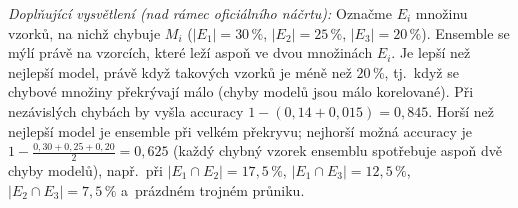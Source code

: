 \medskip
\noindent\textit{Doplňující vysvětlení (nad rámec oficiálního náčrtu):} Označme $E_i$ množinu vzorků, na nichž chybuje $M_i$ ($|E_1|=30\,\%$, $|E_2|=25\,\%$, $|E_3|=20\,\%$). Ensemble se mýlí právě na vzorcích, které leží aspoň ve dvou množinách $E_i$. Je lepší než nejlepší model, právě když takových vzorků je méně než $20\,\%$, tj.\ když se chybové množiny překrývají málo (chyby modelů jsou málo korelované). Při nezávislých chybách by vyšla accuracy $1-(0{,}14+0{,}015)=0{,}845$. Horší než nejlepší model je ensemble při velkém překryvu; nejhorší možná accuracy je $1-\frac{0{,}30+0{,}25+0{,}20}{2}=0{,}625$ (každý chybný vzorek ensemblu spotřebuje aspoň dvě chyby modelů), např.\ při $|E_1\cap E_2|=17{,}5\,\%$, $|E_1\cap E_3|=12{,}5\,\%$, $|E_2\cap E_3|=7{,}5\,\%$ a~prázdném trojném průniku.
